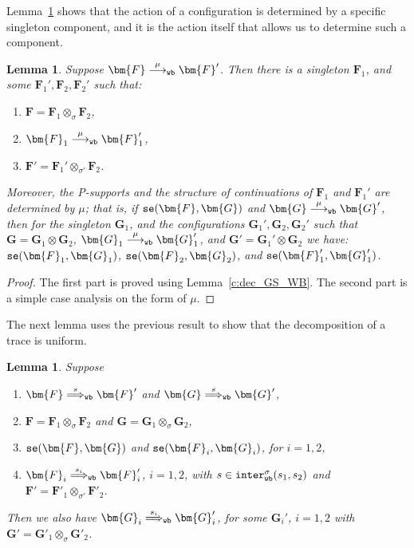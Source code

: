 \documentclass[11pt,a4paper]{amsart}
\theoremstyle{plain}
\theoremstyle{definition}
\theoremstyle{defC}
\theoremstyle{thmC}
\theoremstyle{plain}
\numberwithin{equation}{section}
\newif\ifcutLMCS\cutLMCSfalse
\newcommand{\tr}{s}
\newcommand{\stt}{\sigma}
\newcommand{\Supports}{supports\xspace}      %
\newcommand{\appendCon}[2]{#1 \otimes #2}
\newcommand{\okC}[2]{{\tt se}(#1,#2)}  %
\newcommand{\rmm}[1]{{\tt{\lowercase{#1}}}}
\newcommand{\genarr}[2]{\mathrel{\stackrel{{#1}}{\longrightarrow}_{\rmm{\lowercase{#2}}}}}
\newcommand{\genArr}[2]{\mathrel{\stackrel{{#1}}{\Longrightarrow}_{\rmm{\lowercase{#2}}}}}  %
\newcommand{\arrWB}[1]{\genarr{#1}{WB}}           %
\newcommand{\ArrWB}[1]{\genArr{#1}{WB}}          %
\newcommand{\interlWBs}[3]{{\tt inter_{wb}^{#1}}( #2, #3)}
\newcommand{\FF}{F}
\newcommand{\GG}{G}
\newcommand{\FFb}{{\bm{\FF}}} %
\newcommand{\GGb}{{\bm{\GG}}} %
\theoremstyle{plain}
\newtheorem{lemma}[thm]{Lemma}
\theoremstyle{definition}
\begin{document}
\ifcutLMCS
Lemma~\ref{l:decNsig-WB} shows that the action of a configuration is 
determined by a specific singleton component, 
and it is the action itself that allows us to determine such a component.

\begin{lemma}
\label{l:decNsig-WB}
Suppose $\FFb \arrWB\mu \FFb'$.
Then there is a singleton $\FFb_1$, and some $\FFb_1',\FFb_2,\FFb_2'$ such that:

\begin{enumerate}
\item $\FFb =
 {\FFb_1} \otimes_{\stt} {\FFb_2}$,
\item $\FFb_1 \arrWB\mu \FFb_1'$,
\item $\FFb' =
 {\FFb_1'} \otimes_{\stt'} {\FFb_2}$.
\end{enumerate} 
 
Moreover, the P-\Supports and the structure of continuations of $\FFb_1$ and $\FFb_1'$  
are determined by 
$\mu$; that is, 
if  $\okC \FFb\GGb$ and
 $\GGb \arrWB\mu \GGb'$, then for  
 the singleton $\GGb_1$, and the configurations $\GGb_1',\GGb_2,\GGb_2'$ such that
 $\GGb = \appendCon
 {\GGb_1} {\GGb_2}$,
 $\GGb_1 \arrWB\mu \GGb_1'$, and 
 $\GGb' = \appendCon
 {\GGb_1'} {\GGb_2}$ we have: 
 $\okC{\FFb_1}{\GGb_1}$, $\okC{\FFb_2}{\GGb_2}$, and 
$\okC{\FFb_1'}{\GGb_1'}$.  
 \end{lemma} 



\begin{proof}
The first part is proved using Lemma~\ref{c:dec_GS_WB}. 
The second part is a simple case analysis on the form of $\mu$.
\end{proof} 

The next lemma uses the previous result to show that the decomposition of a trace 
is uniform.

\begin{lemma}
\label{l:decNsig2-WB}
Suppose 
\begin{enumerate}
\item
$\FFb \ArrWB \tr   \FFb'$
and $\GGb \ArrWB \tr   \GGb'$, 
\item  
 $\FFb = \FFb_1 \otimes_\stt \FFb_2$ and 
 $\GGb = \GGb_1 \otimes_\stt \GGb_2$,  
\item 
  $\okC \FFb\GGb$ and  
  $\okC {\FFb_i}{\GGb_i}$, for $i=1,2$,   
\item 
$\FFb_i \ArrWB{\tr_i}  \FFb_i'$, $i=1,2$,  with $\tr \in \interlWBs{\stt}{\tr_1}{\tr_2}$ and 
 $\FFb' = \FFb'_1 \otimes_{\stt'} \FFb'_2$.
\end{enumerate} 
Then we also have 
$\GGb_i \ArrWB{\tr_i}   \GGb_i'$, for some $\GGb_i'$, 
$i=1,2$ with 
 $\GGb' = \GGb'_1 \otimes_\stt \GGb'_2$.
\end{lemma} 
\end{document}
